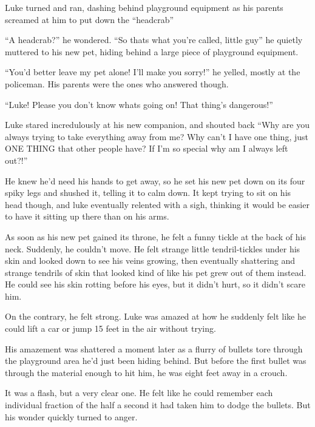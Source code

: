 Luke turned and ran, dashing behind playground equipment as his
parents screamed at him to put down the ``headcrab''



``A headcrab?'' he wondered. ``So thats what you're called, little
guy'' he quietly muttered to his new pet, hiding behind a large
piece of playground equipment.



``You'd better leave my pet alone! I'll make you sorry!'' he yelled,
mostly at the policeman. His parents were the ones who answered
though.



``Luke! Please you don't know whats going on! That thing's
dangerous!''



Luke stared incredulously at his new companion, and shouted back
``Why are you always trying to take everything away from me? Why
can't I have one thing, just ONE THING that other people have? If
I'm so special why am I always left out?!''



He knew he'd need his hands to get away, so he set his new pet down
on its four spiky legs and shushed it, telling it to calm down. It
kept trying to sit on his head though, and luke eventually relented
with a sigh, thinking it would be easier to have it sitting up
there than on his arms.



As soon as his new pet gained its throne, he felt a funny tickle at
the back of his neck. Suddenly, he couldn't move. He felt strange
little tendril-tickles under his skin and looked down to see his
veins growing, then eventually shattering and strange tendrils of
skin that looked kind of like his pet grew out of them instead. He
could see his skin rotting before his eyes, but it didn't hurt, so
it didn't scare him.



On the contrary, he felt strong. Luke was amazed at how he suddenly
felt like he could lift a car or jump 15 feet in the air without
trying.



His amazement was shattered a moment later as a flurry of bullets
tore through the playground area he'd just been hiding behind. But
before the first bullet was through the material enough to hit him,
he was eight feet away in a crouch.



It was a flash, but a very clear one. He felt like he could
remember each individual fraction of the half a second it had taken
him to dodge the bullets. But his wonder quickly turned to
anger.



